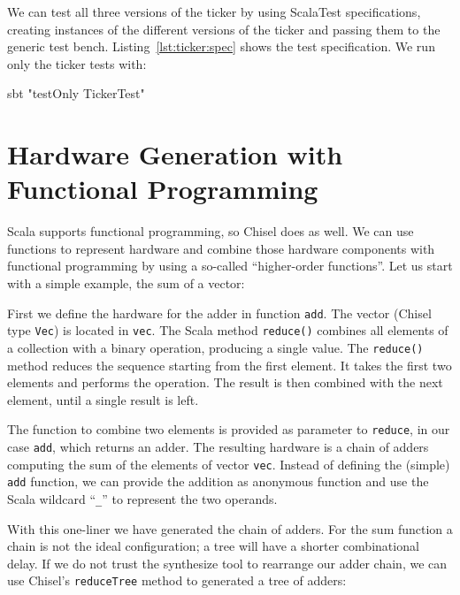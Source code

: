 \documentclass[%
    10pt,
    headinclude, footexclude,
    openright, %
    notitlepage,
    cleardoubleempty,
    headsepline,
    pointlessnumbers,
    bibtotoc, idxtotoc,
    ]{scrbook}
\newcommand{\code}[1]{{\small{\texttt{#1}}}}
\begin{document}

We can test all three versions of the ticker by using ScalaTest specifications,
creating instances of the different versions of the ticker and passing them
to the generic test bench. Listing~\ref{lst:ticker:spec} shows the test specification.
We run only the ticker tests with:
\begin{chisel}
sbt "testOnly TickerTest"
\end{chisel}


\section{Hardware Generation with Functional Programming}
\label{sec:functional}


Scala supports functional programming, so Chisel does as well.
We can use functions to represent hardware and combine those hardware components
with functional programming by using a so-called ``higher-order functions''.
Let us start with a simple example, the sum of a vector:


First we define the hardware for the adder in function \code{add}.
The vector (Chisel type \code{Vec}) is located in \code{vec}. The Scala method \code{reduce()} combines
all elements of a collection with a binary operation, producing a single value.
The \code{reduce()} method reduces the sequence starting from the first element.
It takes the first two elements and performs the operation. The result is then combined
with the next element, until a single result is left.

The function to combine two elements is provided as parameter to \code{reduce}, in our case \code{add},
which returns an adder. The resulting hardware is a chain of adders computing
the sum of the elements of vector \code{vec}.
Instead of defining the (simple) \code{add} function, we can provide the addition
as anonymous function and use the Scala wildcard ``\code{\_}'' to represent the
two operands.


\noindent With this one-liner we have generated the chain of adders. For the sum function
a chain is not the ideal configuration; a tree will have a shorter combinational delay.
If we do not trust the synthesize tool to rearrange our adder chain, we can use Chisel's
\code{reduceTree} method to generated a tree of adders:
\end{document}
